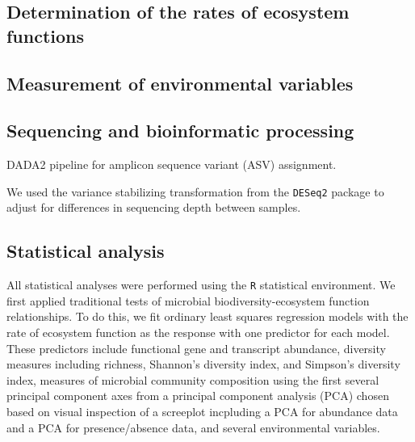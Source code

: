 \documentclass{article}
\begin{document}
\subsection{Determination of the rates of ecosystem functions}

\subsection{Measurement of environmental variables}

\subsection{Sequencing and bioinformatic processing}

DADA2 pipeline for amplicon sequence variant (ASV) assignment.

We used the variance stabilizing transformation from the \texttt{DESeq2}
package to adjust for differences in sequencing depth between samples. 

\subsection{Statistical analysis}

All statistical analyses were performed using the \texttt{R} statistical
environment. 
We first applied traditional tests of microbial biodiversity-ecosystem function
relationships. To do this, we fit ordinary least squares regression models with
the rate of ecosystem function as the response with one predictor for each
model. These predictors include functional gene and transcript abundance,
diversity measures including richness, Shannon's diversity index, and Simpson's
diversity index, measures of microbial community composition using the first
several principal component axes from a principal component
analysis (PCA) chosen based on visual inspection of a screeplot incpluding a PCA for
abundance data and a PCA for presence/absence data, and several 
environmental variables. 
\end{document}
